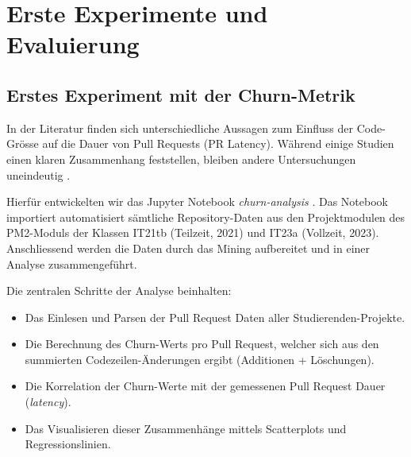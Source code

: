 


\chapter{Erste Experimente und Evaluierung} %

\label{Chapter4} %

\section{Erstes Experiment mit der Churn-Metrik}
In der Literatur finden sich unterschiedliche Aussagen zum Einfluss der Code-Grösse auf die Dauer von Pull Requests (PR Latency). Während einige Studien einen klaren Zusammenhang feststellen, bleiben andere Untersuchungen uneindeutig \parencite{hasan_understanding_2023}\parencite{kudrjavets_small_2022}.

Hierfür entwickelten wir das Jupyter Notebook \textit{churn-analysis} \parencite{stumpf_simon_repo-detectivesba-metric-analysis-scripts_nodate}. Das Notebook importiert automatisiert sämtliche Repository-Daten aus den Projektmodulen des PM2-Moduls der Klassen IT21tb (Teilzeit, 2021) und IT23a (Vollzeit, 2023). Anschliessend werden die Daten durch das Mining aufbereitet und in einer Analyse zusammengeführt.

Die zentralen Schritte der Analyse beinhalten:

\begin{itemize}
    \item Das Einlesen und Parsen der Pull Request Daten aller Studierenden-Projekte.
    \item Die Berechnung des Churn-Werts pro Pull Request, welcher sich aus den summierten Codezeilen-Änderungen ergibt (Additionen + Löschungen).
    \item Die Korrelation der Churn-Werte mit der gemessenen Pull Request Dauer (\textit{latency}).
    \item Das Visualisieren dieser Zusammenhänge mittels Scatterplots und Regressionslinien.
\end{itemize}

